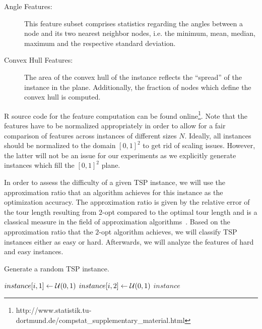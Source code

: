 \documentclass{article}
\begin{document}
\begin{description}
\item[Angle Features:] This feature subset comprises statistics
  regarding the angles between a node and its two nearest neighbor
  nodes, i.e. the minimum, mean, median, maximum and the respective
  standard deviation.

\item[Convex Hull Features:] The area of the convex hull of the
  instance reflects the ``spread'' of the instance in the
  plane. Additionally, the fraction of nodes which define the convex
  hull is computed.
\end{description}

R \cite{RR} source code for the feature computation can be found online\footnote{\label{fn:code} http://www.statistik.tu-dortmund.de/compstat\_supplementary\_material.html}. Note that the features have to be
normalized appropriately in order to allow for a fair comparison of
features across instances of different sizes $N$. Ideally, all
instances should be normalized to the domain $[0,1]^2$ to get rid of
scaling issues. However, the latter will not be an issue for our
experiments as we explicitly generate instances which fill the
$[0,1]^2$ plane.

In order to assess the difficulty of a given TSP instance, we will use
the approximation ratio that an algorithm achieves for this instance
as the optimization accuracy. The approximation ratio is given by the
relative error of the tour length resulting from $2$-opt compared to
the optimal tour length and is a classical measure in the field of
approximation algorithms~\cite{Vaz01}. Based on the approximation
ratio that the $2$-opt algorithm achieves, we will classify TSP
instances either as easy or hard. Afterwards, we will analyze the
features of hard and easy instances.

\def\mat#1{\mathbf #1}
\def\abs#1{\left|#1\right|}

\begin{algorithm}
  \caption{Generate a random TSP instance.}
  \label{alg:randomInstance}
  \begin{algorithmic}
    \State $instance[i, 1] \gets {\cal U}(0, 1)$
    \State $instance[i, 2] \gets {\cal U}(0, 1)$
    \EndFor
    \State \Return $instance$
    \EndFunction
  \end{algorithmic}
\end{algorithm}
\end{document}

